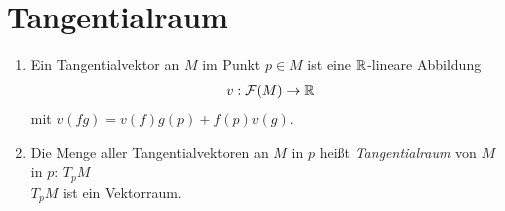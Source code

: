 \section{Tangentialraum} 


\begin{defs}
\begin{enumerate}
\item Ein Tangentialvektor an $M$ im Punkt $p \in M$ ist eine $\mathbb{R}$-lineare Abbildung
\begin{align*}
v: \mathcal{F}(M) \rightarrow \mathbb{R}
\end{align*}
mit $v(fg) = v(f)g(p) + f(p)v(g)$.
\item Die Menge aller Tangentialvektoren an $M$ in $p$ heißt \textit{Tangentialraum} von $M$ in $p$: $T_pM$\\
$T_pM$ ist ein Vektorraum.
\end{enumerate}
\end{defs}
